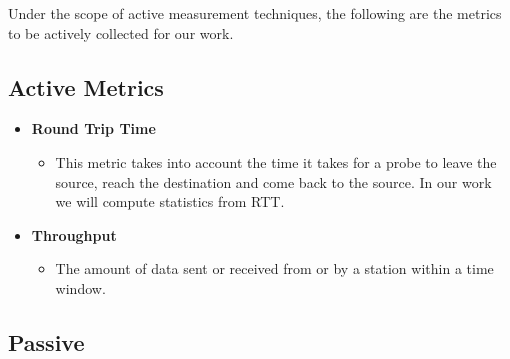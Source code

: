 Under the scope of active measurement techniques, the following are the metrics to be actively collected for our work.

\subsection*{Active Metrics}

\begin{itemize}
	\item \textbf{Round Trip Time}
	\begin{itemize}
		\item This metric takes into account the time it takes for a probe to leave the source, reach the destination and come back to the source. In our work we will compute statistics from RTT.
	\end{itemize}
	
	\item \textbf{Throughput}
	\begin{itemize}
		\item The amount of data sent or received from or by a station within a time window. 
	\end{itemize}
\end{itemize}

\subsection*{Passive}

